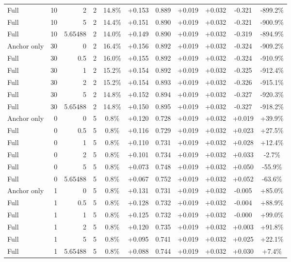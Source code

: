 \begin{table}[htbp]
\begin{tabular}{lrrrccccccc}
Full & 10 & 2 & 2 & 14.8\% & +0.153 & 0.889 & +0.019 & +0.032 & -0.321 & -899.2\% \\
Full & 10 & 5 & 2 & 14.4\% & +0.151 & 0.890 & +0.019 & +0.032 & -0.321 & -900.9\% \\
Full & 10 & 5.65488 & 2 & 14.0\% & +0.149 & 0.890 & +0.019 & +0.032 & -0.319 & -894.9\% \\
Anchor only & 30 & 0 & 2 & 16.4\% & +0.156 & 0.892 & +0.019 & +0.032 & -0.324 & -909.2\% \\
Full & 30 & 0.5 & 2 & 16.0\% & +0.155 & 0.892 & +0.019 & +0.032 & -0.324 & -910.9\% \\
Full & 30 & 1 & 2 & 15.2\% & +0.154 & 0.892 & +0.019 & +0.032 & -0.325 & -912.4\% \\
Full & 30 & 2 & 2 & 15.2\% & +0.154 & 0.893 & +0.019 & +0.032 & -0.326 & -915.1\% \\
Full & 30 & 5 & 2 & 14.8\% & +0.152 & 0.894 & +0.019 & +0.032 & -0.327 & -920.3\% \\
Full & 30 & 5.65488 & 2 & 14.8\% & +0.150 & 0.895 & +0.019 & +0.032 & -0.327 & -918.2\% \\
Anchor only & 0 & 0 & 5 & 0.8\% & +0.120 & 0.728 & +0.019 & +0.032 & +0.019 & +39.9\% \\
Full & 0 & 0.5 & 5 & 0.8\% & +0.116 & 0.729 & +0.019 & +0.032 & +0.023 & +27.5\% \\
Full & 0 & 1 & 5 & 0.8\% & +0.110 & 0.731 & +0.019 & +0.032 & +0.028 & +12.4\% \\
Full & 0 & 2 & 5 & 0.8\% & +0.101 & 0.734 & +0.019 & +0.032 & +0.033 & -2.7\% \\
Full & 0 & 5 & 5 & 0.8\% & +0.073 & 0.748 & +0.019 & +0.032 & +0.050 & -55.9\% \\
Full & 0 & 5.65488 & 5 & 0.8\% & +0.067 & 0.752 & +0.019 & +0.032 & +0.052 & -63.6\% \\
Anchor only & 1 & 0 & 5 & 0.8\% & +0.131 & 0.731 & +0.019 & +0.032 & -0.005 & +85.0\% \\
Full & 1 & 0.5 & 5 & 0.8\% & +0.128 & 0.732 & +0.019 & +0.032 & -0.004 & +88.9\% \\
Full & 1 & 1 & 5 & 0.8\% & +0.125 & 0.732 & +0.019 & +0.032 & -0.000 & +99.0\% \\
Full & 1 & 2 & 5 & 0.8\% & +0.120 & 0.735 & +0.019 & +0.032 & +0.003 & +91.8\% \\
Full & 1 & 5 & 5 & 0.8\% & +0.095 & 0.741 & +0.019 & +0.032 & +0.025 & +22.1\% \\
Full & 1 & 5.65488 & 5 & 0.8\% & +0.088 & 0.744 & +0.019 & +0.032 & +0.030 & +7.4\% \\

\end{tabular}
\end{table}

